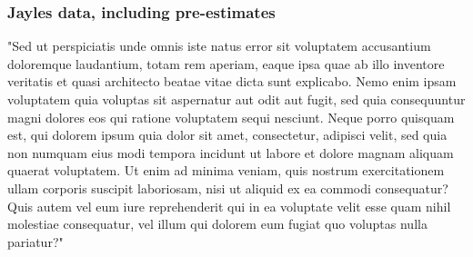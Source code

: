 \documentclass[10pt,a4paper,twocolumn,lineno]{article}
\begin{document}
\subsubsection{Jayles data, including pre-estimates}
 

"Sed ut perspiciatis unde omnis iste natus error sit voluptatem accusantium doloremque laudantium, totam rem aperiam, eaque ipsa quae ab illo inventore veritatis et quasi architecto beatae vitae dicta sunt explicabo. Nemo enim ipsam voluptatem quia voluptas sit aspernatur aut odit aut fugit, sed quia consequuntur magni dolores eos qui ratione voluptatem sequi nesciunt. Neque porro quisquam est, qui dolorem ipsum quia dolor sit amet, consectetur, adipisci velit, sed quia non numquam eius modi tempora incidunt ut labore et dolore magnam aliquam quaerat voluptatem. Ut enim ad minima veniam, quis nostrum exercitationem ullam corporis suscipit laboriosam, nisi ut aliquid ex ea commodi consequatur? Quis autem vel eum iure reprehenderit qui in ea voluptate velit esse quam nihil molestiae consequatur, vel illum qui dolorem eum fugiat quo voluptas nulla pariatur?"
\end{document}
